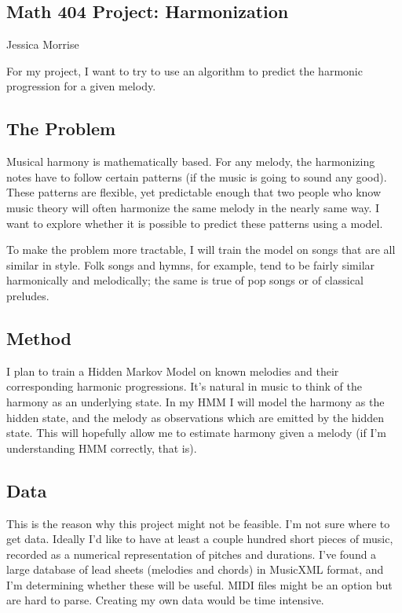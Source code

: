 \documentclass[10pt]{article}
\begin{document}
\begin{center}
\section*{Math 404 Project: Harmonization}
Jessica Morrise
\end{center}

For my project, I want to try to use an algorithm to predict the harmonic progression for a given melody.

\subsection*{The Problem}
Musical harmony is mathematically based. For any melody, the harmonizing notes have to follow certain patterns (if the music is going to sound any good). These patterns are flexible, yet predictable enough that two people who know music theory will often harmonize the same melody in the nearly same way. I want to explore whether it is possible to predict these patterns using a model.

To make the problem more tractable, I will train the model on songs that are all similar in style. Folk songs and hymns, for example, tend to be fairly similar harmonically and melodically; the same is true of pop songs or of classical preludes. 

\subsection*{Method}
I plan to train a Hidden Markov Model on known melodies and their corresponding harmonic progressions. It's natural in music to think of the harmony as an underlying state. In my HMM I will model the harmony as the hidden state, and the melody as observations which are emitted by the hidden state. This will hopefully allow me to estimate harmony given a melody (if I'm understanding HMM correctly, that is).

\subsection*{Data}
This is the reason why this project might not be feasible. I'm not sure where to get data. Ideally I'd like to have at least a couple hundred short pieces of music, recorded as a numerical representation of pitches and durations. I've found a large database of lead sheets (melodies and chords) in MusicXML format, and I'm determining whether these will be useful. MIDI files might be an option but are hard to parse. Creating my own data would be time intensive. 
\end{document}
